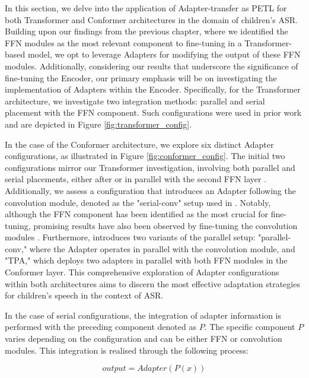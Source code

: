 In this section, we delve into the application of Adapter-transfer as PETL for both Transformer and Conformer architectures in the domain of children's ASR. Building upon our findings from the previous chapter, where we identified the FFN modules as the most relevant component to fine-tuning in a Transformer-based model, we opt to leverage Adapters for modifying the output of these FFN modules. Additionally, considering our results that underscore the significance of fine-tuning the Encoder, our primary emphasis will be on investigating the implementation of Adapters within the Encoder. Specifically, for the Transformer architecture, we investigate two integration methods: parallel and serial placement with the FFN component. Such configurations were used in prior work \cite{he2021towards} and are depicted in Figure \ref{fig:transformer_config}.

In the case of the Conformer architecture, we explore six distinct Adapter configurations, as illustrated in Figure \ref{fig:conformer_config}. The initial two configurations mirror our Transformer investigation, involving both parallel and serial placements, either after or in parallel with the second FFN layer \cite{chen2023efficient}. Additionally, we assess a configuration that introduces an Adapter following the convolution module, denoted as the "serial-conv" setup used in \cite{10095837}. Notably, although the FFN component has been identified as the most crucial for fine-tuning, promising results have also been observed by fine-tuning the convolution modules \cite{chen2023efficient}. Furthermore, \cite{chen2023efficient} introduces two variants of the parallel setup: "parallel-conv," where the Adapter operates in parallel with the convolution module, and "TPA," which deploys two adapters in parallel with both FFN modules in the Conformer layer. This comprehensive exploration of Adapter configurations within both architectures aims to discern the most effective adaptation strategies for children's speech in the context of ASR. 


In the case of serial configurations, the integration of adapter information is performed with the preceding component denoted as $P$. The specific component $P$ varies depending on the configuration and can be either FFN or convolution modules. This integration is realised through the following process:

\begin{equation}
    output =  Adapter(P(x))
\end{equation}

